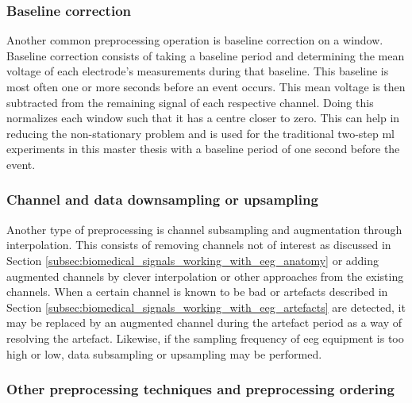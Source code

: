 
\subsubsection{Baseline correction}
\label{subsubsec:processing_signals_general_pipeline_preprocessing_baseline_correction}

Another common preprocessing operation is baseline correction on a window.
Baseline correction consists of taking a baseline period and determining the mean voltage of each electrode's measurements during that baseline.
This baseline is most often one or more seconds before an event occurs.
This mean voltage is then subtracted from the remaining signal of each respective channel.
Doing this normalizes each window such that it has a centre closer to zero.
This can help in reducing the non-stationary problem and is used for the traditional two-step \gls{ml} experiments in this master thesis with a baseline period of one second before the event.


\subsubsection{Channel and data downsampling or upsampling}
\label{subsubsec:processing_signals_general_pipeline_preprocessing_subsampling}

Another type of preprocessing is channel subsampling and augmentation through interpolation.
This consists of removing channels not of interest as discussed in Section \ref{subsec:biomedical_signals_working_with_eeg_anatomy} or adding augmented channels by clever interpolation or other approaches from the existing channels.
When a certain channel is known to be bad or artefacts described in Section \ref{subsec:biomedical_signals_working_with_eeg_artefacts} are detected, it may be replaced by an augmented channel during the artefact period as a way of resolving the artefact.
Likewise, if the sampling frequency of \gls{eeg} equipment is too high or low, data subsampling or upsampling may be performed.


\subsubsection{Other preprocessing techniques and preprocessing ordering}
\label{subsubsec:processing_signals_general_pipeline_preprocessing_orders}

